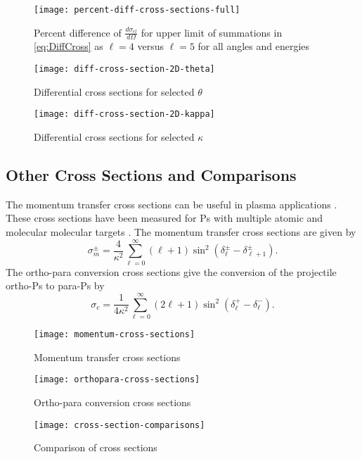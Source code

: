 \documentclass[Dissertation.tex]{subfiles}
\begin{document}
\begin{figure}[H]
	\centering
	\texttt{[image: percent-diff-cross-sections-full]}
	\caption[Percent difference of differential cross sections at all angles]{Percent difference of $\frac{d\sigma_{el}}{d\Omega}$ for upper limit of summations in \ref{eq:DiffCross} as $\ell = 4$ versus $\ell = 5$ for all angles and energies}
	\label{fig:percent-diff-cross-sections-full}
\end{figure}

\begin{figure}[H]
	\centering
	\texttt{[image: diff-cross-section-2D-theta]}
	\caption{Differential cross sections for selected $\theta$}
	\label{fig:diff-cross-section-2D-theta}
\end{figure}

\begin{figure}[H]
	\centering
	\texttt{[image: diff-cross-section-2D-kappa]}
	\caption{Differential cross sections for selected $\kappa$}
	\label{fig:diff-cross-section-2D-kappa}
\end{figure}


\subsection{Other Cross Sections and Comparisons}
\label{sec:OtherCross}

The momentum transfer cross sections can be useful in plasma applications \cite{Wang2014, McEachran2014}. These cross sections have been measured for Ps with multiple atomic and molecular molecular targets \cite{Nagashima1998,Saito2003}. The momentum transfer cross sections are given by \cite{Bransden2003}
\begin{equation}
\label{eq:MomentumCross}
\sigma_{m}^\pm = \frac{4}{\kappa^2} \sum_{\ell=0}^\infty (\ell+1) \sin^2 (\delta_\ell^\pm - \delta_{\ell+1}^\pm) .
\end{equation}
The ortho-para conversion cross sections give the conversion of the projectile ortho-Ps to para-Ps by \cite{Hara1975}
\begin{equation}
\label{eq:OrthoParaCross}
\sigma_{c} = \frac{1}{4 \kappa^2} \sum_{\ell=0}^\infty (2 \ell+1) \sin^2 (\delta_\ell^+ - \delta_\ell^-).
\end{equation}

\begin{figure}[H]
	\centering
	\texttt{[image: momentum-cross-sections]}
	\caption{Momentum transfer cross sections}
	\label{fig:momentum-cross-sections}
\end{figure}

\begin{figure}[H]
	\centering
	\texttt{[image: orthopara-cross-sections]}
	\caption{Ortho-para conversion cross sections}
	\label{fig:orthopara-cross-sections}
\end{figure}

\begin{figure}[H]
	\centering
	\texttt{[image: cross-section-comparisons]}
	\caption{Comparison of cross sections}
	\label{fig:cross-section-comparisons}
\end{figure}
\end{document}
